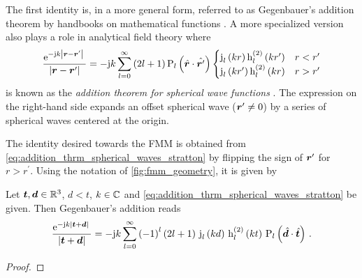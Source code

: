 The first identity is, in a more general form, referred to as Gegenbauer's
addition theorem by handbooks on mathematical functions
\cite[eq. 10.23.8]{Olver2010} \cite[9.1.80]{Abramowitz2014}.
A more specialized version also plays a role in analytical field theory where
\cite[p.~414]{Stratton2007}
\begin{equation}\label{eq:addition_thrm_spherical_waves_stratton}
	\frac{\exp{-\im k \abs{\rdiff}}}{\abs{\rdiff}} =
	-\im k \sum\limits_{l=0}^{\infty}
	\left(2l + 1\right)
	\legendrepl{l} \left( \uv{r} \cdot \uv{r^\prime} \right)
	\begin{cases}
		\sphbesselj{l}    \left( k r        \right)
		\sphbesselh{2}{l} \left( k r^\prime \right)
		& r < r^\prime \\
		\sphbesselj{l}    \left( k r^\prime \right)
		\sphbesselh{2}{l} \left( k r        \right)
		& r > r^\prime
	\end{cases}
\end{equation}
is known as the \emph{addition theorem for spherical wave functions}
\cite[p.~362]{Jin2015}.
The expression on the right-hand side expands an offset spherical wave
($\rsrc \neq 0$) by a series of spherical waves centered at the origin.

The identity desired towards the \ac{FMM} is obtained from
\eqref{eq:addition_thrm_spherical_waves_stratton} by flipping the sign of 
$\rsrc$ for $r > r^\prime$.
Using the notation of \cref{fig:fmm_geometry}, it is given by
\begin{corollary}
	Let $\pvec{t}, \pvec{d} \in \R^3$, $d < t$, $k \in \mathbb{C}$ and
	\eqref{eq:addition_thrm_spherical_waves_stratton} be given.
	Then Gegenbauer's addition reads
	\begin{equation}\label{eq:fmm_std_gegenbauer}
		\frac{\exp{-\im k \abs{\pvec{t} + \pvec{d}}}}{\abs{\pvec{t} + \pvec{d}}} = 
		-\im k \sum\limits_{l=0}^{\infty}
		\left( -1 \right)^l
		\left( 2l + 1 \right) \,
		\sphbesselj{l} \left( k d  \right) \,
		\sphbesselh{2}{l} \left( k t \right) \, 
		\legendrepl{l} \left( \uv{d} \cdot \uv{t} \right) \, .
	\end{equation}
\end{corollary} 

\begin{proof}
\end{proof}

